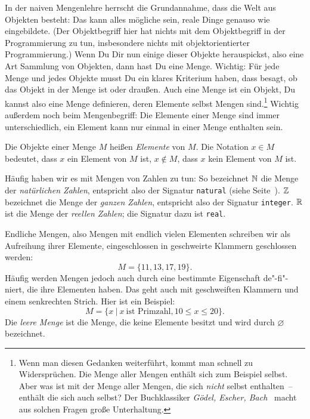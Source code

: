 In der naiven Mengenlehre herrscht die Grundannahme, dass die Welt aus
Objekten besteht: Das kann alles mögliche sein, reale Dinge genauso
wie eingebildete.  (Der Objektbegriff hier hat nichts mit dem
Objektbegriff in der Programmierung zu tun, insbesondere nichts mit
objektorientierter Programmierung.)  Wenn Du Dir nun einige dieser
Objekte herauspickst, also eine Art Sammlung von Objekten, dann hast
Du eine Menge.  Wichtig: Für jede Menge und jedes Objekte musst Du ein
klares Kriterium haben, dass besagt, ob das Objekt in der Menge ist
oder draußen.  Auch eine Menge ist ein Objekt, Du kannst also eine
Menge definieren, deren Elemente selbst Mengen sind.\footnote{Wenn man
  diesen Gedanken weiterführt, kommt man schnell zu Widersprüchen.
  Die Menge aller Mengen enthält sich zum Beispiel selbst.  Aber was
  ist mit der Menge aller Mengen, die sich \emph{nicht} selbst
  enthalten~-- enthält die sich auch selbst?  Der Buchklassiker
  \textit{Gödel, Escher, Bach}~\cite{Hofstadter1979} macht aus solchen
  Fragen große Unterhaltung.}  Wichtig außerdem noch beim
Mengenbegriff: Die Elemente einer Menge sind immer unterschiedlich,
ein Element kann nur einmal in einer Menge enthalten sein.

Die Objekte einer Menge $M$ heißen \textit{Elemente} von $M$. Die Notation
$ x \in M$ 
bedeutet, dass $x$ ein Element von $M$ ist, $x \not \in M$, dass $x$ kein
Element von $M$ ist.

Häufig haben wir es mit Mengen von Zahlen zu tun: So bezeichnet
$\mathbb{N}$ die Menge der \emph{natürlichen
  Zahlen}, entspricht also der Signatur
\lstinline{natural} (siehe
Seite~\pageref{page:natural}). $\mathbb{Z}$ bezeichnet die
Menge der \emph{ganzen Zahlen}, entspricht also
der Signatur \lstinline{integer}. $\mathbb{R}$ ist die Menge
der \emph{reellen Zahlen}; die Signatur dazu ist
\lstinline{real}.

Endliche Mengen, also Mengen mit endlich vielen Elementen
schreiben wir als Aufreihung ihrer Elemente, 
eingeschlossen in geschweirte Klammern geschlossen werden:
\[M = \{ 11, 13, 17, 19\}.\]
Häufig werden Mengen jedoch auch durch eine bestimmte Eigenschaft de"-fi"-niert,
die ihre Elementen haben.  Das geht auch mit geschweiften Klammern und
einem senkrechten Strich.  Hier ist ein Beispiel:
%
\[M = \{x\ |\ x\ \mbox{ist Primzahl}, 10 \le x \le 20\}.\]
%
Die \emph{leere Menge} %
ist die Menge, die keine Elemente besitzt und wird
durch $\varnothing$ bezeichnet.

